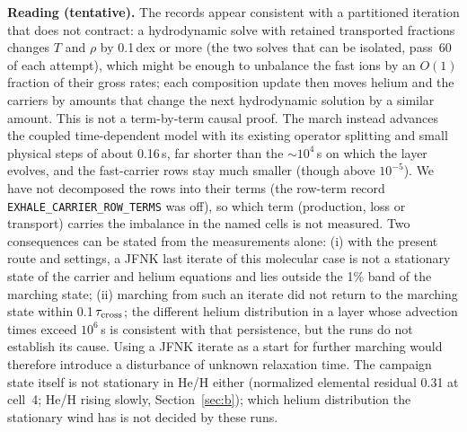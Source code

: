 \documentclass[english,a4paper]{my_memo}
\begin{document}
\textbf{Reading (tentative).} The records appear consistent with a
partitioned iteration that does not contract: a hydrodynamic solve with
retained transported fractions changes $T$ and $\rho$ by 0.1\,dex or more
(the two solves that can be isolated, pass~60 of each attempt), which
might be enough to unbalance the fast ions by an $O(1)$ fraction of their
gross rates; each composition update then moves helium and the carriers by
amounts that change the next hydrodynamic solution by a similar amount.
This is not a term-by-term causal proof. The march instead advances the
coupled time-dependent model with its existing operator splitting and small
physical steps of about 0.16\,s, far shorter than the
$\sim10^4$\,s on which the layer evolves, and the fast-carrier rows stay much
smaller (though above $10^{-5}$). We have not decomposed the rows into their terms (the row-term
record \texttt{EXHALE\_CARRIER\_ROW\_TERMS} was off), so which term
(production, loss or transport) carries the imbalance in the named cells is
not measured. Two consequences can be stated from the measurements alone:
(i) with the present route and settings, a JFNK last iterate of this
molecular case is not a stationary state of the carrier and helium
equations and lies outside the 1\% band of the marching state; (ii)
marching from such an iterate did not return to the marching state within
0.1\,$\tau_{\rm cross}$; the different helium distribution in a layer whose
advection times exceed $10^6$\,s is consistent with that persistence, but
the runs do not establish its cause. Using a JFNK iterate as a start for
further marching would therefore introduce a disturbance of unknown
relaxation time. The
campaign state itself is not stationary in He/H either (normalized
elemental residual 0.31 at cell~4; He/H rising slowly, Section~\ref{sec:b}); which helium
distribution the stationary wind has is not decided by these runs.
\end{document}

